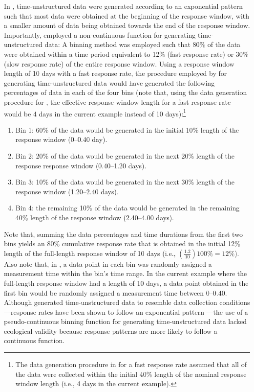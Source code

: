 \documentclass[
12pt, %
twoside,
english]{guelphthesis}
\begin{document}
In \textcite{coulombe2016}, time-unstructured data were generated according to an exponential pattern such that most data were obtained at the beginning of the response window, with a smaller amount of data being obtained towards the end of the response window. Importantly, \textcite{coulombe2016} employed a non-continuous function for generating time-unstructured data: A binning method was employed such that 80\% of the data were obtained within a time period equivalent to 12\% (fast response rate) or 30\% (slow response rate) of the entire response window. Using a response window length of 10 days with a fast response rate, the procedure employed by \textcite{coulombe2016} for generating time-unstructured data would have generated the following percentages of data in each of the four bins (note that, using the data generation procedure for \textcite{coulombe2016}, the effective response window length for a fast response rate would be 4 days in the current example instead of 10 days):\footnote{The data generation procedure in \textcite{coulombe2016} for a fast response rate assumed that all of the data were collected within the initial 40\% length of the nominal response window length (i.e., 4 days in the current example).}
\begin{enumerate}
\def\labelenumi{\arabic{enumi})}
\tightlist
\item
  Bin 1: 60\% of the data would be generated in the initial 10\% length of the response window (0--0.40 day).
\item
  Bin 2: 20\% of the data would be generated in the next 20\% length of the response response window (0.40--1.20 days).
\item
  Bin 3: 10\% of the data would be generated in the next 30\% length of the response window (1.20--2.40 days).
\item
  Bin 4: the remaining 10\% of the data would be generated in the remaining 40\% length of the response window (2.40--4.00 days).
\end{enumerate}
\noindent Note that, summing the data percentages and time durations from the first two bins yields an 80\% cumulative response rate that is obtained in the initial 12\% length of the full-length response window of 10 days (i.e., \((\frac{1.2}{10})100\% = 12\%\)). Also note that, in \textcite{coulombe2016}, a data point in each bin was randomly assigned a measurement time within the bin's time range. In the current example where the full-length response window had a length of 10 days, a data point obtained in the first bin would be randomly assigned a measurement time between 0--0.40. Although \textcite{coulombe2016} generated time-unstructured data to resemble data collection conditions---response rates have been shown to follow an exponential pattern \autocite{dillman2014,pan2010}---the use of a pseudo-continuous binning function for generating time-unstructured data lacked ecological validity because response patterns are more likely to follow a continuous function.
\end{document}
